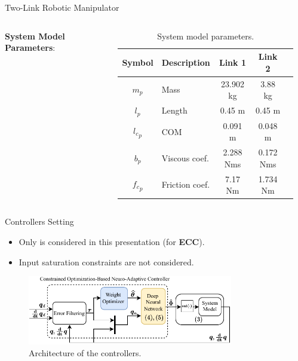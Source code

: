 \documentclass[8pt, aspectratio=169]{beamer}
\newcommand{\ctxt}[2]{\color{#1}{#2}\color{black} }
\begin{document}
\begin{frame}{\insertsubsectionhead}{Two-Link Robotic Manipulator}
\begin{columns}
      \textbf{System Model Parameters}:

      \begin{table}
        \renewcommand{\arraystretch}{1.3}
        \caption{System model parameters.}
        \centering
        \begin{tabular}{c m{5em} c c c }
        \hline
        \textbf{Symbol} & \textbf{Description} & \textbf{Link 1} & \textbf{Link 2} \\
        \hline
        \hline 
        $m_p$ & Mass & 23.902 kg & 3.88 kg \\
        \hline
        $l_p$  & Length & 0.45 m & 0.45 m \\
        \hline
        ${l_c}_p$ & COM & 0.091 m & 0.048 m \\
        \hline
        $b_p$   & Viscous coef. &  2.288 Nms & 0.172 Nms \\
        \hline
        ${f_c}_p$  & Friction coef. & 7.17 Nm & 1.734 Nm \\
        \hline
        \end{tabular}
        \label{table: system parameters}
      \end{table}

    \end{columns}

\end{frame}

\begin{frame}{\insertsubsectionhead}{Controllers Setting}
  
  \begin{itemize}
    \item Only \ctxt{awesome}{weight norm constraint } is considered in this presentation (for \textbf{ECC}).
    \item Input saturation constraints are not considered.
  \end{itemize}

  \centering
  \begin{figure}
    \includegraphics[width=0.8\textwidth]{figures/Controller.drawio.pdf}
    \caption{Architecture of the controllers.}
  \end{figure}

\end{frame}
\end{document}
